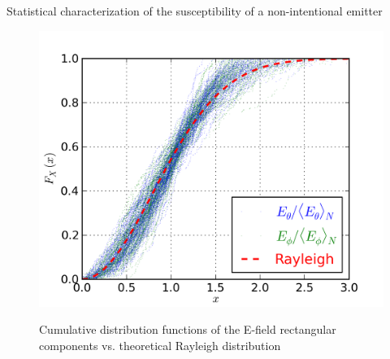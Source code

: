 \documentclass[final,hyperref={pdfpagelabels=false}]{beamer}
\begin{document}
\begin{frame}{}
\begin{columns}[t]
\begin{column}{0.32\linewidth}
\begin{block}{{Statistical characterization of the susceptibility of a non-intentional emitter}}
\begin{figure}
{   	  \includegraphics[trim=20 20 20 10,width=0.44\columnwidth]{./img/CDF_ka_2_n_4.png}}\\
\vspace{-0.3cm}
    \large{\caption{Cumulative distribution functions of the E-field rectangular components vs. theoretical Rayleigh distribution}}
     \label{fig_diagsr}
\end{figure}
\end{block}

     

    \end{column}%


\end{columns}
\end{frame}
\end{document}
